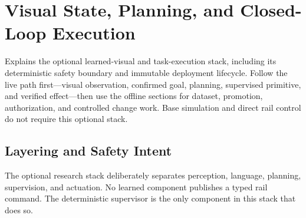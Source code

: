 \chapter{Visual State, Planning, and Closed-Loop Execution}
\label{ch:visual-state-planning}

\chapteroverview
  {Explains the optional learned-visual and task-execution stack, including its
   deterministic safety boundary and immutable deployment lifecycle.}
  {Follow the live path first---visual observation, confirmed goal, planning,
   supervised primitive, and verified effect---then use the offline sections
   for dataset, promotion, authorization, and controlled change work. Base
   simulation and direct rail control do not require this optional stack.}

\section{Layering and Safety Intent}

The optional research stack deliberately separates perception, language,
planning, supervision, and actuation. No learned component publishes a typed
rail command. The deterministic supervisor is the only component in this stack
that does so.

